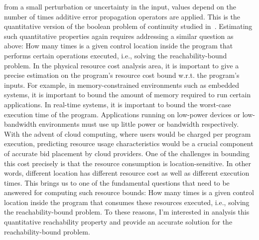 {from a small perturbation or uncertainty in the input, values depend on the number of times additive error propagation operators are applied.
This is the quantitative version of the boolean problem of continuity studied in~\cite{ChaudhuriGL10}. 
Estimating such quantitative properties again requires addressing a similar question as above:
How many times is a given control location inside the program that performs certain operations executed,
i.e., solving the reachability-bound problem.
In the physical resource cost analysis area, it is important to give a precise estimation
on the program's resource cost bound w.r.t. the program's inputs.
For example, in memory-constrained environments such as embedded systems,
it is important to bound the amount of memory required to run certain applications.
In real-time systems, it is important to bound the worst-case execution time of the program.
Applications running on low-power devices or low-bandwidth environments must use up little power or bandwidth respectively. 
With the advent of cloud computing, where users would be charged per program execution,
predicting resource usage characteristics would be a crucial component of accurate bid placement by cloud providers. 
One of the challenges in bounding this cost precisely is that the resource consumption is location-sensitive.
In other words, different location has different resource cost as well as different execution times.
This brings us to one of the fundamental questions that need to be answered for computing such resource bounds:
How many times is a given control location inside the program that consumes these resources executed,
i.e., solving the reachability-bound problem.
To these reasons, I'm interested in analysis this quantitative reachability property
and provide an accurate solution for the reachability-bound problem.
}%

